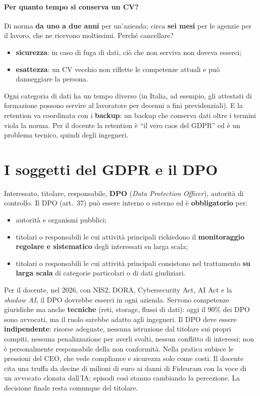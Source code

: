 \paragraph{Per quanto tempo si conserva un CV?} Di norma \textbf{da uno a due anni} per un'azienda;
circa \textbf{sei mesi} per le agenzie per il lavoro, che ne ricevono moltissimi. Perché cancellare?
\begin{itemize}
  \item \textbf{sicurezza}: in caso di fuga di dati, ciò che non serviva non doveva esserci;
  \item \textbf{esattezza}: un CV vecchio non riflette le competenze attuali e può danneggiare la
    persona.
\end{itemize}
Ogni categoria di dati ha un tempo diverso (in Italia, ad esempio, gli attestati di formazione possono
servire al lavoratore per decenni a fini previdenziali). E la retention va coordinata con i
\textbf{backup}: un backup che conserva dati oltre i termini viola la norma. Per il docente la
retention è ``il vero caos del GDPR'' ed è un problema tecnico, quindi degli ingegneri.

\section{I soggetti del GDPR e il DPO}
Interessato, titolare, responsabile, \textbf{DPO} (\emph{Data Protection Officer}), autorità di
controllo. Il DPO (art.~37) può essere interno o esterno ed è \textbf{obbligatorio} per:
\begin{itemize}
  \item autorità e organismi pubblici;
  \item titolari o responsabili le cui attività principali richiedono il \textbf{monitoraggio regolare
    e sistematico} degli interessati su larga scala;
  \item titolari o responsabili le cui attività principali consistono nel trattamento \textbf{su larga
    scala} di categorie particolari o di dati giudiziari.
\end{itemize}
Per il docente, nel 2026, con NIS2, DORA, Cybersecurity Act, AI Act e la \emph{shadow AI}, il DPO
dovrebbe esserci in ogni azienda. Servono competenze giuridiche ma anche \textbf{tecniche} (reti,
storage, flussi di dati): oggi il 90\% dei DPO sono avvocati, ma il ruolo sarebbe adatto agli
ingegneri. Il DPO deve essere \textbf{indipendente}: risorse adeguate, nessuna istruzione dal titolare
sui propri compiti, nessuna penalizzazione per averli svolti, nessun conflitto di interessi; non è
personalmente responsabile della non conformità. Nella pratica subisce le pressioni del CEO, che vede
compliance e sicurezza solo come costi. Il docente cita una truffa da decine di milioni di euro ai
danni di Fideuram con la voce di un avvocato clonata dall'IA: episodi così stanno cambiando la
percezione. La decisione finale resta comunque del titolare.

